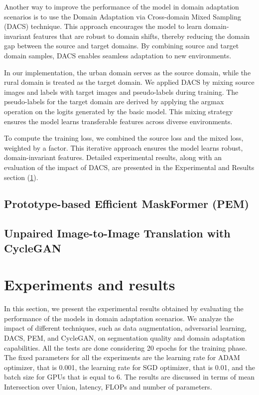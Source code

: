 \documentclass[10pt,twocolumn,letterpaper]{article}
\begin{document}
Another way to improve the performance of the model in domain adaptation scenarios is to use the Domain Adaptation via Cross-domain Mixed Sampling (DACS) technique. This approach encourages the model to learn domain-invariant features that are robust to domain shifts, thereby reducing the domain gap between the source and target domains. By combining source and target domain samples, DACS enables seamless adaptation to new environments.

In our implementation, the urban domain serves as the source domain, while the rural domain is treated as the target domain. We applied DACS by mixing source images and labels with target images and pseudo-labels during training. The pseudo-labels for the target domain are derived by applying the argmax operation on the logits generated by the basic model. This mixing strategy ensures the model learns transferable features across diverse environments.

To compute the training loss, we combined the source loss and the mixed loss, weighted by a factor. This iterative approach ensures the model learns robust, domain-invariant features. Detailed experimental results, along with an evaluation of the impact of DACS, are presented in the Experimental and Results section (\ref{sec:experiments}).


\subsection{Prototype-based Efficient MaskFormer (PEM)}

\subsection{Unpaired Image-to-Image Translation with CycleGAN}

\section{Experiments and results}
\label{sec:experiments}

In this section, we present the experimental results obtained by evaluating the performance of the models in domain adaptation scenarios. We analyze the impact of different techniques, such as data augmentation, adversarial learning, DACS, PEM, and CycleGAN, on segmentation quality and domain adaptation capabilities. All the tests are done considering 20 epochs for the training phase. The fixed parameters for all the experiments are the learning rate for ADAM optimizer, that is 0.001, the learning rate for SGD optimizer, that is 0.01, and the batch size for GPUs that is equal to 6.  The results are discussed in terms of mean Intersection over Union, latency, FLOPs and number of parameters. 
\end{document}
